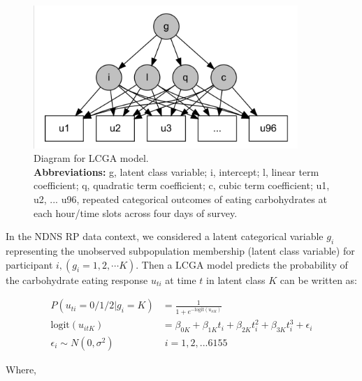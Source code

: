 \begin{figure}[H]
	\centering
	\includegraphics[width=10cm]{Figures/LCGAdiagramme.jpeg}
	\decoRule
	\caption[Diagramme for LCGA model]{Diagram for LCGA model.\\ \scriptsize{\textbf{Abbreviations:} g, latent class variable; i, intercept; l, linear term coefficient; q, quadratic term coefficient; c, cubic term coefficient; u1, u2, ... u96, repeated categorical outcomes of eating carbohydrates at each hour/time slots across four days of survey.}}
	\label{fig:LCGAdiagram}
\end{figure}\vspace{-0.6cm}

In the NDNS RP data context, we considered a latent categorical variable $g_i$ representing the unobserved subpopulation membership (latent class variable) for participant $i, (g_{i} = 1,2,\cdots K)$. Then a LCGA model predicts the probability of the carbohydrate eating response $u_{ti}$ at time $t$ in latent class $K$ can be written as: \vspace{-0.3cm}

\begin{equation}
\begin{aligned}
P(u_{ti} = 0/1/2 |g_i = K) &  = \frac{1}{1 + e^{-\text{logit}(u_{itK})}} \\
\text{logit}(u_{itK}) & = \beta_{0K} + \beta_{1K}t_{i} + \beta_{2K}t^2_i + \beta_{3K}t^3_i + \epsilon_{i} \\ 
\epsilon_{i} \sim N(0, \sigma^2) & \;i = 1,2,...6155
\end{aligned}
\end{equation}\vspace{-0.6cm}

Where, 


